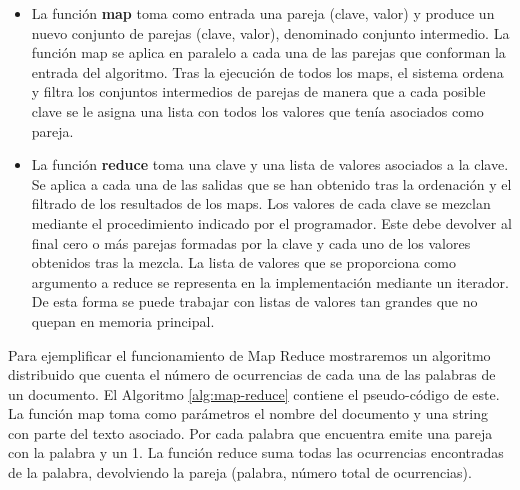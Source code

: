 \documentclass[10pt]{article}
\begin{document}
		\begin{itemize}
			\item La función \textbf{map} toma como entrada una pareja (clave, valor) y produce un nuevo conjunto de parejas (clave, valor), denominado conjunto intermedio. La función map se aplica en paralelo a cada una de las parejas que conforman la entrada del algoritmo. Tras la ejecución de todos los maps, el sistema ordena y filtra los conjuntos intermedios de parejas de manera que a cada posible clave se le asigna una lista con todos los valores que tenía asociados como pareja.
			\item La función \textbf{reduce} toma una clave y una lista de valores asociados a la clave. Se aplica a cada una de las salidas que se han obtenido tras la ordenación y el filtrado de los resultados de los maps. Los valores de cada clave se mezclan mediante el procedimiento indicado por el programador. Este debe devolver al final cero o más parejas formadas por la clave y cada uno de los valores obtenidos tras la mezcla. La lista de valores que se proporciona como argumento a reduce se representa en la implementación mediante un iterador. De esta forma se puede trabajar con listas de valores tan grandes que no quepan en memoria principal.
		\end{itemize}  
		
		Para ejemplificar el funcionamiento de Map Reduce mostraremos un algoritmo distribuido que cuenta el número de ocurrencias de cada una de las palabras de un documento. El Algoritmo \ref{alg:map-reduce} contiene el pseudo-código de este. La función map toma como parámetros el nombre del documento y una string con parte del texto asociado. Por cada palabra que encuentra emite una pareja con la palabra y un 1. La función reduce suma todas las ocurrencias encontradas de la palabra, devolviendo la pareja (palabra, número total de ocurrencias).
		
\end{document}
